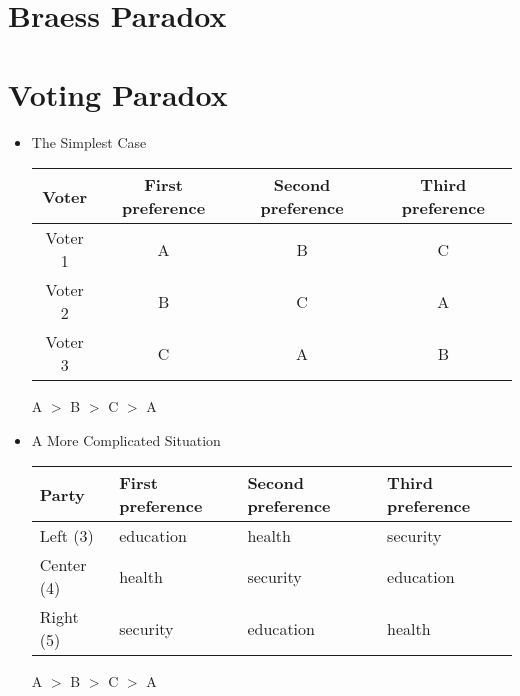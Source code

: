 \documentclass[10pt]{beamer}
\begin{document}
\section{Braess Paradox}

\begin{frame}

\end{frame}

\section{Voting Paradox}

\begin{frame}
  
  \begin{itemize}
    \item The Simplest Case
      \vspace{3mm}
      \begin{table}
        \center
        \begin{tabular}{cccc}
          \toprule
          \textbf{Voter} & \textbf{First preference} & \textbf{Second preference} & \textbf{Third preference} \\
          \midrule
          Voter 1 & A & B & C \\
          Voter 2 & B & C & A \\
          Voter 3 & C & A & B \\
          \bottomrule
        \end{tabular}
      \end{table}
      \vspace{3mm}
      \begin{center} A $>$ B $>$ C $>$ A \end{center}
      \vspace{1mm} 
    \item A More Complicated Situation
      \vspace{3mm}
      \begin{table}
        \center
        \begin{tabular}{llll}
          \toprule
          \textbf{Party} & \textbf{First preference} & \textbf{Second preference} & \textbf{Third preference} \\
          \midrule
          Left (3)   & education & health & security \\
          Center (4) & health & security & education \\
          Right (5)  & security & education & health \\
          \bottomrule
        \end{tabular}
      \end{table}
      \vspace{3mm}
        \begin{center} A $>$ B $>$ C $>$ A \end{center}
      \vspace{3mm} 
  \end{itemize}
\end{frame}
\end{document}
